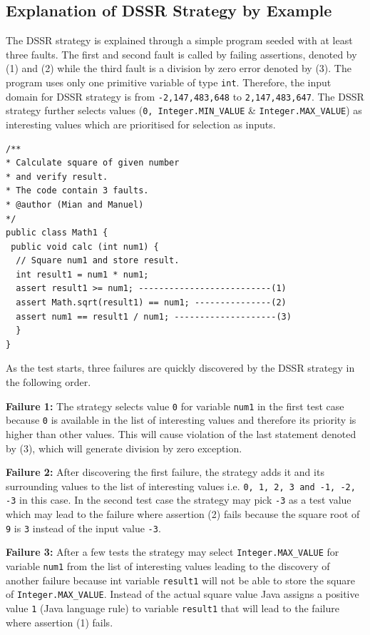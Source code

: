 
\newpage
\subsection{Explanation of DSSR Strategy by Example}
The DSSR strategy is explained through a simple program seeded with at least three faults. The first and second fault is called by failing assertions, denoted by (1) and (2) while the third fault is a division by zero error denoted by (3). The program uses only one primitive variable of type \verb+int+. Therefore, the input domain for DSSR strategy is from \verb+-2,147,483,648+ to \verb+2,147,483,647+. The DSSR strategy further selects values (\verb+0, Integer.MIN_VALUE+ \& \verb+Integer.MAX_VALUE+) as interesting values which are prioritised for selection as inputs. 

\bigskip
\begin{lstlisting}
/** 
* Calculate square of given number 
* and verify result. 
* The code contain 3 faults.
* @author (Mian and Manuel)
*/
public class Math1 {
 public void calc (int num1) {
  // Square num1 and store result. 
  int result1 = num1 * num1; 
  assert result1 >= num1; --------------------------(1)
  assert Math.sqrt(result1) == num1; ---------------(2)
  assert num1 == result1 / num1; --------------------(3)
  } 
}
\end{lstlisting}
\bigskip

As the test starts, three failures are quickly discovered by the DSSR strategy in the following order.

\indent \textbf{Failure 1:} The strategy selects value \verb+0+ for variable \verb+num1+  in the first test case because \verb+0+ is available in the list of interesting values and therefore its priority is higher than other values. This will cause violation of the last statement denoted by (3), which will generate division by zero exception.

\indent \textbf{Failure 2:} After discovering the first failure, the strategy adds it and its surrounding values to the list of interesting values i.e. \verb+0, 1, 2, 3 and -1, -2, -3+ in this case. In the second test case the strategy may pick \verb+-3+ as a test value which may lead to the failure where assertion (2) fails because the square root of \verb+9+ is \verb+3+ instead of the input value \verb+-3+.

\indent \textbf{Failure 3:} After a few tests the strategy may select \verb+Integer.MAX_VALUE+ for variable \verb+num1+  from the list of interesting values leading to the discovery of another failure because int variable \verb+result1+ will not be able to store the square of \verb+Integer.MAX_VALUE+. Instead of the actual square value Java assigns a positive value \verb+1+ (Java language rule) to variable \verb+result1+ that will lead to the failure where assertion (1) fails.

